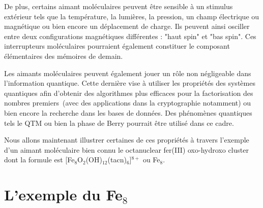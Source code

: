 De plus, certains aimant moléculaires peuvent être sensible à un stimulus extérieur tels que la température, la lumières, la pression, un champ électrique ou magnétique ou bien encore un déplacement de charge. Ils peuvent ainsi osciller entre deux configurations magnétiques différentes : "haut spin" et "bas spin". Ces interrupteurs moléculaires pourraient également constituer le composant élémentaires des mémoires de demain.

Les aimants moléculaires peuvent également jouer un rôle non négligeable dans l'information quantique. Cette dernière vise à utiliser les propriétés des systèmes quantiques afin d'obtenir des algorithmes plus efficaces pour la factorisation des nombres premiers~(avec des applications dans la cryptographie notamment) ou bien encore la recherche dans les bases de données. Des phénomènes quantiques tels le QTM ou bien la phase de Berry pourrait être utilisé dans ce cadre.

Nous allons maintenant illustrer certaines de ces propriétés à travers l'exemple d'un aimant moléculaire bien connu le octanuclear fer(III) oxo-hydroxo cluster dont la formule est [Fe$_8$O$_2$(OH)$_{12}$(tacn)$_6$]$^{8+}$ ou Fe$_8$.

\section{L'exemple du Fe$_8$}


